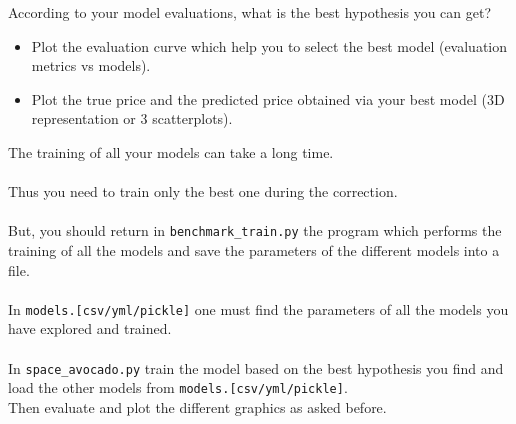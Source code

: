 According to your model evaluations, what is the best hypothesis you can get?
\begin{itemize}
  \item Plot the evaluation curve which help you to select the best model (evaluation metrics vs models).
  \item Plot the true price and the predicted price obtained via your best model (3D representation or 3 scatterplots).
\end{itemize}

The training of all your models can take a long time.\\
\\
Thus you need to train only the best one during the correction.\\
\\
But, you should return in \texttt{benchmark\_train.py} the program which performs the training of all the models and save the parameters of the different models into a file.\\
\\
In \texttt{models.[csv/yml/pickle]} one must find the parameters of all the models you have explored and trained.\\
\\
In \texttt{space\_avocado.py} train the model based on the best hypothesis you find and load the other models from \texttt{models.[csv/yml/pickle]}.
\\
Then evaluate and plot the different graphics as asked before.